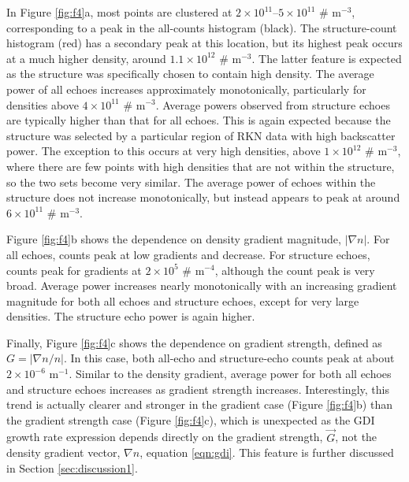 In Figure \ref{fig:f4}a, most points are clustered at \(2\times10^{11}\)--\(5\times10^{11}\) \# m\(^{-3}\), corresponding to a peak in the all-counts histogram (black).  The structure-count histogram (red) has a secondary peak at this location, but its highest peak occurs at a much higher density, around \(1.1\times10^{12}\) \# m\(^{-3}\).  The latter feature is expected as the structure was specifically chosen to contain high density. The average power of all echoes increases approximately monotonically, particularly for densities above \(4\times10^{11}\) \# m\(^{-3}\). Average powers observed from structure echoes are typically higher than that for all echoes.  This is again expected because the structure was selected by a particular region of RKN data with high backscatter power.  The exception to this occurs at very high densities, above \(1\times10^{12}\) \# m\(^{-3}\), where there are few points with high densities that are not within the structure, so the two sets become very similar.  The average power of echoes within the structure does not increase monotonically, but instead appears to peak at around \(6\times10^{11}\) \# m\(^{-3}\).

Figure \ref{fig:f4}b shows the dependence on density gradient magnitude, \(|\nabla n|\).  For all echoes, counts peak at low gradients and decrease.  For structure echoes, counts peak for gradients at \(2\times10^5\) \# m\(^{-4}\), although the count peak is very broad.  Average power increases nearly monotonically with an increasing gradient magnitude for both all echoes and structure echoes, except for very large densities. The structure echo power is again higher.

Finally, Figure \ref{fig:f4}c shows the dependence on gradient strength, defined as \(G = |\nabla n/n|\).  In this case, both all-echo and structure-echo counts peak at about \(2\times10^{-6}\) m\(^{-1}\).  Similar to the density gradient, average power for both all echoes and structure echoes increases as gradient strength increases.  Interestingly, this trend is actually clearer and stronger in the gradient case (Figure \ref{fig:f4}b) than the gradient strength case (Figure \ref{fig:f4}c), which is unexpected as the GDI growth rate expression depends directly on the gradient strength, \(\vec{G}\), not the density gradient vector, \(\nabla n\), equation \ref{eqn:gdi}.  This feature is further discussed in Section \ref{sec:discussion1}.



